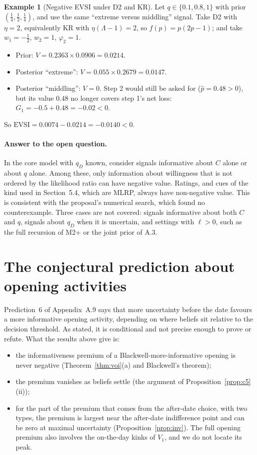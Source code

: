 \documentclass[11pt,a4paper]{article}
\theoremstyle{definition}
\newtheorem{example}[theorem]{Example}
\theoremstyle{remark}
\newcommand{\pp}{\hat p}
\begin{document}
\begin{example}[Negative EVSI under D2 and KR]\label{ex:negD2}
Let $q\in\{0.1,0.8,1\}$ with prior $(\tfrac14,\tfrac12,\tfrac14)$, and use the same ``extreme versus middling'' signal. Take D2 with $\eta=2$, equivalently KR with $\eta(\Lambda-1)=2$, so $f(p)=p(2p-1)$; and take $w_1=-\tfrac12$, $w_2=1$, $\varphi_2=1$.
\begin{itemize}[nosep]
\item Prior: $V=0.2363\times0.0906=0.0214$.
\item Posterior ``extreme'': $V=0.055\times0.2679=0.0147$.
\item Posterior ``middling'': $V=0$. Step 2 would still be asked for ($\pp=0.48>0$), but its value $0.48$ no longer covers step 1's net loss: $G_1=-0.5+0.48=-0.02<0$.
\end{itemize}
So $\mathrm{EVSI}=0.0074-0.0214=-0.0140<0$.
\end{example}

\paragraph{Answer to the open question.}
In the core model with $q_D$ known, consider signals informative about $C$ alone or about $q$ alone. Among these, only information about willingness that is not ordered by the likelihood ratio can have negative value. Ratings, and cues of the kind used in Section~5.4, which are MLRP, always have non-negative value. This is consistent with the proposal's numerical search, which found no counterexample. Three cases are not covered: signals informative about both $C$ and $q$, signals about $q_D$ when it is uncertain, and settings with $\ell>0$, such as the full recursion of M2+ or the joint prior of A.3.

\section{The conjectural prediction about opening activities}

Prediction~6 of Appendix~A.9 says that more uncertainty before the date favours a more informative opening activity, depending on where beliefs sit relative to the decision threshold. As stated, it is conditional and not precise enough to prove or refute. What the results above give is:
\begin{itemize}[nosep]
\item the informativeness premium of a Blackwell-more-informative opening is never negative (Theorem~\ref{thm:voi}(a) and Blackwell's theorem);
\item the premium vanishes as beliefs settle (the argument of Proposition~\ref{prop:c5}(ii));
\item for the part of the premium that comes from the after-date choice, with two types, the premium is largest near the after-date indifference point and can be zero at maximal uncertainty (Proposition~\ref{prop:inv}). The full opening premium also involves the on-the-day kinks of $V_1$, and we do not locate its peak.
\end{itemize}
\end{document}
